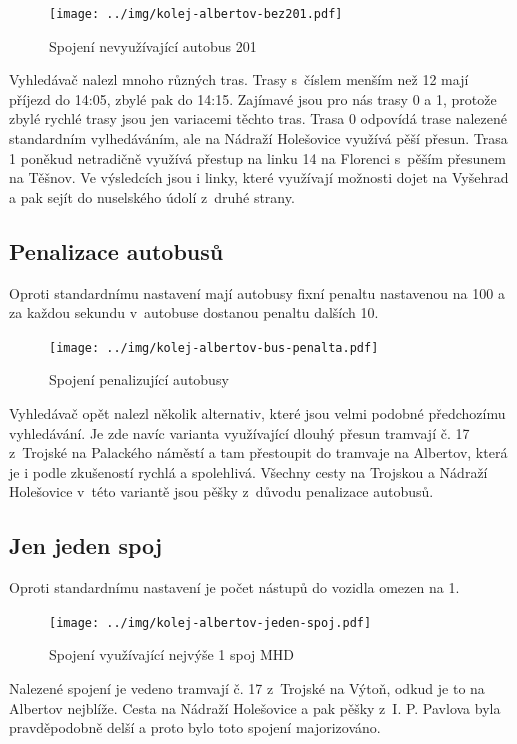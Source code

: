 \begin{figure}[h]
  \centering
    \texttt{[image: ../img/kolej-albertov-bez201.pdf]}
  \caption{Spojení nevyužívající autobus 201}
  \label{fig:kolej-albertov-bez201}
\end{figure}

Vyhledávač nalezl mnoho různých tras. Trasy s~číslem menším než 12 mají příjezd
do 14:05, zbylé pak do 14:15. Zajímavé jsou pro nás trasy 0 a 1, protože zbylé
rychlé trasy jsou jen variacemi těchto tras. Trasa 0 odpovídá trase nalezené
standardním vylhedáváním, ale na Nádraží Holešovice využívá pěší přesun. Trasa 1
poněkud netradičně využívá přestup na linku 14 na Florenci s~pěším přesunem na
Těšnov. Ve výsledcích jsou i linky, které využívají možnosti dojet na Vyšehrad a
pak sejít do nuselského údolí z~druhé strany.

\subsection{Penalizace autobusů}
Oproti standardnímu nastavení mají autobusy fixní penaltu nastavenou na 100 a za
každou sekundu v~autobuse dostanou penaltu dalších 10. 

\begin{figure}[h]
  \centering
    \texttt{[image: ../img/kolej-albertov-bus-penalta.pdf]}
  \caption{Spojení penalizující autobusy}
  \label{fig:kolej-albertov-bus-penalta}
\end{figure}

Vyhledávač opět nalezl několik alternativ, které jsou velmi podobné předchozímu
vyhledávání. Je zde navíc varianta využívající dlouhý přesun tramvají č. 17
z~Trojské na Palackého náměstí a tam přestoupit do tramvaje na Albertov, která je
i podle zkušeností rychlá a spolehlivá. Všechny cesty na Trojskou a Nádraží
Holešovice v~této variantě jsou pěšky z~důvodu penalizace autobusů. 

\subsection{Jen jeden spoj}
Oproti standardnímu nastavení je počet nástupů do vozidla omezen na 1.

\begin{figure}[h]
  \centering
    \texttt{[image: ../img/kolej-albertov-jeden-spoj.pdf]}
  \caption{Spojení využívající nejvýše 1 spoj MHD}
  \label{fig:kolej-albertov-jeden-spoj}
\end{figure}

Nalezené spojení je vedeno tramvají č. 17 z~Trojské na Výtoň, odkud je to
na Albertov nejblíže. Cesta na Nádraží Holešovice a pak pěšky z~I. P. Pavlova
byla pravděpodobně delší a proto bylo toto spojení majorizováno.

